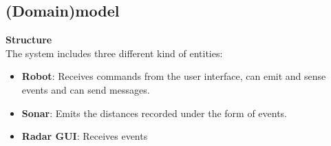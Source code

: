\subsection{(Domain)model}
\textbf{Structure} \\
The system includes three different kind of entities:
\begin{itemize}
	\item \textbf{Robot}: Receives commands from the user interface, can emit and sense events and can send messages.
	\item \textbf{Sonar}: Emits the distances recorded under the form of events.
	\item \textbf{Radar GUI}: Receives events  
\end{itemize}